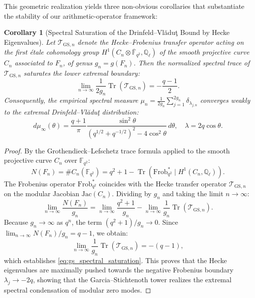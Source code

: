 \documentclass[11pt,reqno]{article}
\theoremstyle{plain}
\newtheorem{corollary}[theorem]{Corollary}
\theoremstyle{definition}
\DeclareMathOperator{\Tr}{Tr}
\begin{document}
This geometric realization yields three non-obvious corollaries that substantiate the stability of our arithmetic-operator framework:

\begin{corollary}[Spectral Saturation of the Drinfeld--Vl\u{a}du\c{t} Bound by Hecke Eigenvalues]
\label{cor:gs_hecke_saturation}
Let $\mathcal{T}_{\mathrm{GS}, n}$ denote the Hecke--Frobenius transfer operator acting on the first étale cohomology group $H^1(C_n \otimes \overline{\mathbb{F}}_{q^2}, \mathbb{Q}_\ell)$ of the smooth projective curve $C_n$ associated to $F_n$, of genus $g_n = g(F_n)$. Then the normalized spectral trace of $\mathcal{T}_{\mathrm{GS}, n}$ saturates the lower extremal boundary:
\begin{equation}
    \label{eq:gs_spectral_saturation}
    \lim_{n \to \infty} \frac{1}{2g_n} \Tr\left( \mathcal{T}_{\mathrm{GS}, n} \right) = - \frac{q - 1}{2}.
\end{equation}
Consequently, the empirical spectral measure $\mu_n = \frac{1}{2g_n} \sum_{j=1}^{2g_n} \delta_{\lambda_{j, n}}$ converges weakly to the extremal Drinfeld--Vl\u{a}du\c{t} distribution:
\begin{equation}
    d\mu_\infty(\theta) = \frac{q+1}{\pi} \frac{\sin^2\theta}{(q^{1/2} + q^{-1/2})^2 - 4\cos^2\theta} \, d\theta, \quad \lambda = 2q \cos\theta.
\end{equation}
\end{corollary}

\begin{proof}
By the Grothendieck--Lefschetz trace formula applied to the smooth projective curve $C_n$ over $\mathbb{F}_{q^2}$:
\begin{equation}
    N(F_n) = \#C_n(\mathbb{F}_{q^2}) = q^2 + 1 - \Tr\left( \mathrm{Frob}_{q^2}^* \mid H^1(C_n, \mathbb{Q}_\ell) \right).
\end{equation}
The Frobenius operator $\mathrm{Frob}_{q^2}^*$ coincides with the Hecke transfer operator $\mathcal{T}_{\mathrm{GS}, n}$ on the modular Jacobian $\mathrm{Jac}(C_n)$. Dividing by $g_n$ and taking the limit $n \to \infty$:
\begin{equation}
    \lim_{n \to \infty} \frac{N(F_n)}{g_n} = \lim_{n \to \infty} \frac{q^2 + 1}{g_n} - \lim_{n \to \infty} \frac{1}{g_n} \Tr\left( \mathcal{T}_{\mathrm{GS}, n} \right).
\end{equation}
Because $g_n \to \infty$ as $q^n$, the term $(q^2 + 1)/g_n \to 0$. Since $\lim_{n \to \infty} N(F_n)/g_n = q - 1$, we obtain:
\begin{equation}
    \lim_{n \to \infty} \frac{1}{g_n} \Tr\left( \mathcal{T}_{\mathrm{GS}, n} \right) = -(q - 1),
\end{equation}
which establishes \eqref{eq:gs_spectral_saturation}. This proves that the Hecke eigenvalues are maximally pushed towards the negative Frobenius boundary $\lambda_j \to -2q$, showing that the Garcia--Stichtenoth tower realizes the extremal spectral condensation of modular zero modes.
\end{proof}
\end{document}
